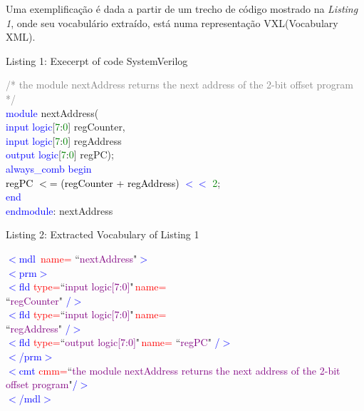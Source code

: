 \documentclass[12pt, twocolumn, a4paper]{article}
\begin{document}
Uma exemplificação é dada a partir de um trecho de código mostrado na \textit{Listing 1}, onde seu vocabulário extraído, está numa representação VXL(Vocabulary XML).
\begin{center}
{\footnotesize Listing 1: Execerpt of code SystemVerilog}
\end{center}
{\footnotesize
\textcolor{gray}{/* the module nextAddress returns the}
\textcolor{gray}{next address of the 2-bit offset program}
\textcolor{gray}{*/}\\
\textcolor{blue}{module} nextAddress(\\\textcolor{blue}{\qquad input logic}[\textcolor{green}{7}:\textcolor{green}{0}] regCounter,\\ \textcolor{blue}{\qquad input logic}[\textcolor{green}{7}:\textcolor{green}{0}] regAddress\\
\textcolor{blue}{\qquad output logic}[\textcolor{green}{7}:\textcolor{green}{0}] regPC);\\
\textcolor{blue}{\quad always\_comb begin}\\
\textcolor{black}{\qquad regPC $<$= (regCounter + regAddress)} \textcolor{blue}{$<<$} \textcolor{green}{2};\\
\textcolor{blue}{\quad end}\\
\textcolor{blue}{endmodule}: nextAddress\\
\begin{center}
{\footnotesize Listing 2: Extracted Vocabulary of Listing 1}
\end{center}}
{\footnotesize
\textcolor{blue}{$<$mdl} \textcolor{red}{\,name=} ``\textcolor{purple}{nextAddress}"\textcolor{blue}{$>$}\\
\textcolor{blue}{\quad$<$prm$>$}\\
\textcolor{blue}{\qquad$<$fld} \textcolor{red}{type=}``\textcolor{purple}{input logic[7:0]}"\textcolor{red}{\,name=}\\\textcolor{black}{\qquad ``}\textcolor{purple}{regCounter}" \textcolor{blue}{/$>$}\\
\textcolor{blue}{\qquad$<$fld} \textcolor{red}{type=}``\textcolor{purple}{input logic[7:0]}"\textcolor{red}{\,name=}\\\textcolor{black}{\qquad ``}\textcolor{purple}{regAddress}" \textcolor{blue}{/$>$}\\
\textcolor{blue}{\qquad$<$fld} \textcolor{red}{type=}``\textcolor{purple}{output logic[7:0]}"\textcolor{red}{\,name=} ``\textcolor{purple}{regPC}" \textcolor{blue}{/$>$}\\
\textcolor{blue}{\quad$<$/prm$>$}\\
\textcolor{blue}{\quad$<$cmt} \textcolor{red}{cmm=}``\textcolor{purple}{the module nextAddress returns the next address of the 2-bit offset program}"\textcolor{blue}{/$>$}\\
\textcolor{blue}{$<$/mdl$>$}}\\
\end{document}
